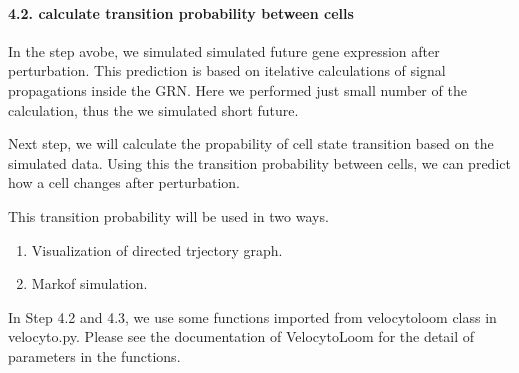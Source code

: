 \documentclass[letterpaper,10pt,english]{sphinxmanual}
\begin{document}
{
%
\begin{sphinxVerbatim}[commandchars=\\\{\}]
\llap{\color{nbsphinxin}[34]:\,\hspace{\fboxrule}\hspace{\fboxsep}}
 
\end{sphinxVerbatim}
}


\paragraph{4.2. calculate transition probability between cells}
\label{\detokenize{notebooks/05_simulation/Gata1_KO_simulation_with_with_Paul_etal_2015_data:4.2.-calculate-transition-probability-between-cells}}
In the step avobe, we simulated simulated future gene expression after perturbation. This prediction is based on itelative calculations of signal propagations inside the GRN. Here we performed just small number of the calculation, thus the we simulated short future.

Next step, we will calculate the propability of cell state transition based on the simulated data. Using this the transition probability between cells, we can predict how a cell changes after perturbation.

This transition probability will be used in two ways.
\begin{enumerate}
\item {} 
Visualization of directed trjectory graph.

\item {} 
Markof simulation.

\end{enumerate}

In Step 4.2 and 4.3, we use some functions imported from velocytoloom class in velocyto.py. Please see the documentation of VelocytoLoom for the detail of parameters in the functions. 
\end{document}
